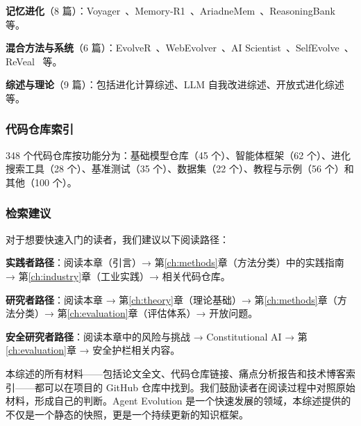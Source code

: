 \textbf{记忆进化}（8 篇）：Voyager~\citep{voyager2023}、Memory-R1~\citep{memoryr1_2025}、AriadneMem~\citep{ariadnemem2025}、ReasoningBank~\citep{reasoningbank2024} 等。

\textbf{混合方法与系统}（6 篇）：EvolveR~\citep{evolver2024}、WebEvolver~\citep{webevolver2024}、AI Scientist~\citep{aiscientist2024}、SelfEvolve~\citep{selfevolve2023}、ReVeal~\citep{reveal2025} 等。

\textbf{综述与理论}（9 篇）：包括进化计算综述、LLM 自我改进综述、开放式进化综述等。

\subsubsection{代码仓库索引}

348 个代码仓库按功能分为：基础模型仓库（45 个）、智能体框架（62 个）、进化搜索工具（28 个）、基准测试（35 个）、数据集（22 个）、教程与示例（56 个）和其他（100 个）。

\subsubsection{检索建议}

对于想要快速入门的读者，我们建议以下阅读路径：

\textbf{实践者路径}：阅读本章（引言）→ 第\ref{ch:methods}章（方法分类）中的实践指南 → 第\ref{ch:industry}章（工业实践）→ 相关代码仓库。

\textbf{研究者路径}：阅读本章 → 第\ref{ch:theory}章（理论基础）→ 第\ref{ch:methods}章（方法分类）→ 第\ref{ch:evaluation}章（评估体系）→ 开放问题。

\textbf{安全研究者路径}：阅读本章中的风险与挑战 → Constitutional AI → 第\ref{ch:evaluation}章 → 安全护栏相关内容。

本综述的所有材料——包括论文全文、代码仓库链接、痛点分析报告和技术博客索引——都可以在项目的 GitHub 仓库中找到。我们鼓励读者在阅读过程中对照原始材料，形成自己的判断。Agent Evolution 是一个快速发展的领域，本综述提供的不仅是一个静态的快照，更是一个持续更新的知识框架。
